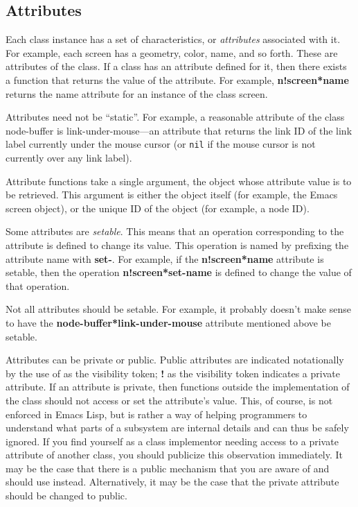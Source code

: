 \subsection{Attributes}  

Each class instance has a set of characteristics, or {\em
attributes}\/ associated with it.  For example, each screen has a
geometry, color, name, and so forth.  These are attributes of the
class.  If a class has an attribute defined for it, then there exists
a function that returns the value of the attribute.  For example, {\bf
n!screen*name} returns the {\sf name} attribute for an instance of the
class {\sf screen}.

Attributes need not be ``static''.  For example, a reasonable
attribute of the class {\sf node-buffer} is {\sf
link-under-mouse}---an attribute that returns the link ID of the link
label currently under the mouse cursor (or {\tt nil} if the mouse
cursor is not currently over any link label).

Attribute functions take a single argument, the object whose attribute
value is to be retrieved.  This argument is either the object itself
(for example, the Emacs screen object), or the unique ID of the object
(for example, a node ID).

Some attributes are {\em setable}.  This means that an operation
corresponding to the attribute is defined to change its value. This
operation is named by prefixing the attribute name with {\bf set-}.
For example, if the {\bf n!screen*name} attribute is setable,
then the operation {\bf n!screen*set-name} is defined to change
the value of that operation.

Not all attributes should be setable.  For example, it probably
doesn't make sense to have the {\bf node-buffer*link-under-mouse}
attribute mentioned above be setable.

Attributes can be private or public.  Public attributes are indicated
notationally by the use of {\bf *} as the visibility token; {\bf !} as
the visibility token indicates a private attribute.  If an attribute is
private, then functions outside the implementation of the class should
not access or set the attribute's value.  This, of course, is not
enforced in Emacs Lisp, but is rather a way of helping programmers to 
understand what parts of a subsystem are internal details and can thus
be safely ignored.  If you find yourself as a class implementor needing 
access to a private attribute of another class, you should publicize this
observation immediately.  It may be the case that there is a public mechanism
that you are aware of and should use instead.  Alternatively, it may be
the case that the private attribute should be changed to public.

